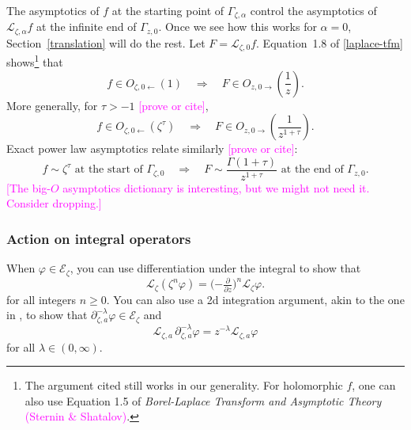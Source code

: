 \documentclass{article}
\theoremstyle{plain}
\newcommand{\laplace}{\mathcal{L}}
\newcommand{\fracderiv}[3]{\partial^{#1}_{#2, #3}}
\begin{document}
The asymptotics of $f$ at the starting point of $\Gamma_{\zeta, \alpha}$ control the asymptotics of $\laplace_{\zeta, \alpha} f$ at the infinite end of $\Gamma_{z, 0}$. Once we see how this works for $\alpha = 0$, Section~\ref{translation} will do the rest. Let $F = \laplace_{\zeta, 0} f$. Equation~1.8 of \ref{laplace-tfm} shows\footnote{The argument cited still works in our generality. For holomorphic $f$, one can also use Equation 1.5 of {\em Borel-Laplace Transform and Asymptotic Theory} \textcolor{magenta}{(Sternin \& Shatalov)}.} that
\[ f \in O_{\zeta, 0 \leftarrow}(1) \quad\Longrightarrow\quad F \in O_{z, 0 \rightarrow}\left(\frac{1}{z}\right). \]
More generally, for $\tau > -1$ \textcolor{magenta}{[prove or cite]},
\[ f \in O_{\zeta, 0 \leftarrow}(\zeta^\tau) \quad\Longrightarrow\quad F \in O_{z, 0 \rightarrow}\left(\frac{1}{z^{1 + \tau}}\right). \]
Exact power law asymptotics relate similarly \textcolor{magenta}{[prove or cite]}:
\[ f \sim \zeta^\tau \text{ at the start of } \Gamma_{\zeta, 0} \quad\Longrightarrow\quad F \sim \frac{\Gamma(1+\tau)}{z^{1+\tau}} \text{ at the end of } \Gamma_{z, 0}. \]
\textcolor{magenta}{[The big-$O$ asymptotics dictionary is interesting, but we might not need it. Consider dropping.]}
\subsubsection{Action on integral operators}\label{L-int-op}
When $\varphi \in \mathcal{E}_\zeta$, you can use differentiation under the integral to show that~\cite[Theorem~1.34]{laplace-tfm}
\begin{equation}%
\laplace_\zeta (\zeta^n \varphi) = \big({-\tfrac{\partial}{\partial z}}\big)^n \laplace_\zeta \varphi.
\end{equation}
for all integers $n \ge 0$. You can also use a 2d integration argument, akin to the one in \cite[Theorem~2.39]{laplace-tfm}, to show that $\fracderiv{-\lambda}{\zeta}{a} \varphi \in \mathcal{E}_\zeta$ and
\[ \laplace_{\zeta, a}\,\fracderiv{-\lambda}{\zeta}{a} \varphi = z^{-\lambda} \laplace_{\zeta, a} \varphi \]
for all $\lambda \in (0, \infty)$.
\end{document}
